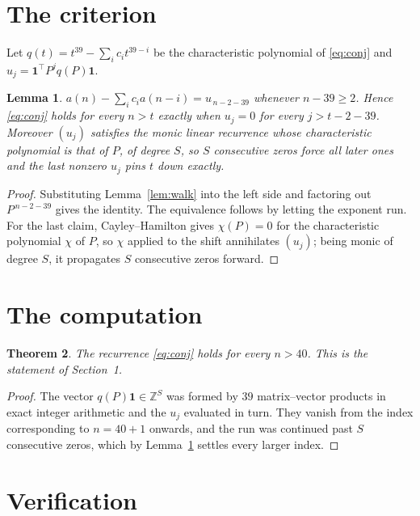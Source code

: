 \documentclass[11pt,a4paper]{article}
\theoremstyle{plain}
\newtheorem{theorem}{Theorem}
\newtheorem{lemma}[theorem]{Lemma}
\theoremstyle{definition}
\begin{document}
\section{The criterion}

Let $q(t)=t^{39}-\sum_i c_i t^{39-i}$ be the characteristic polynomial of
\eqref{eq:conj} and $u_j=\mathbf{1}^{\!\top}P^{j}q(P)\mathbf{1}$.

\begin{lemma}\label{lem:crit}
$a(n)-\sum_i c_i a(n-i)=u_{\,n-2-39}$ whenever $n-39\ge2$. Hence
\eqref{eq:conj} holds for every $n>t$ exactly when $u_j=0$ for every
$j>t-2-39$. Moreover $(u_j)$ satisfies the monic linear recurrence whose
characteristic polynomial is that of $P$, of degree $S$, so $S$ consecutive zeros force all
later ones and the last nonzero $u_j$ pins $t$ down exactly.
\end{lemma}

\begin{proof}
Substituting Lemma~\ref{lem:walk} into the left side and factoring out
$P^{\,n-2-39}$ gives the identity. The equivalence follows by letting the exponent
run. For the last claim, Cayley--Hamilton gives $\chi(P)=0$ for the characteristic
polynomial $\chi$ of $P$, so $\chi$ applied to the shift annihilates $(u_j)$; being monic of
degree $S$, it propagates $S$ consecutive zeros forward.
\end{proof}

\section{The computation}

\begin{theorem}
The recurrence \eqref{eq:conj} holds for every $n>40$. This is the statement of
Section~1.
\end{theorem}

\begin{proof}
The vector $q(P)\mathbf{1}\in\mathbb{Z}^{S}$ was formed by $39$ matrix--vector
products in exact integer arithmetic and the $u_j$ evaluated in turn. They vanish from the
index corresponding to $n=40+1$ onwards, and the run was continued past $S$ consecutive
zeros, which by Lemma~\ref{lem:crit} settles every larger index.
\end{proof}

\section{Verification}
\end{document}
